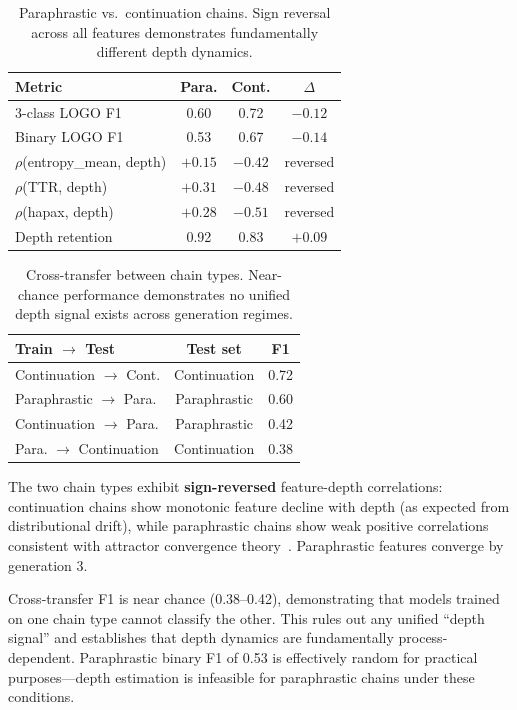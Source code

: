 \documentclass[11pt,a4paper]{article}
\begin{document}
\begin{table}[h]
\centering
\small
\begin{tabular}{lccc}
\toprule
\textbf{Metric} & \textbf{Para.} & \textbf{Cont.} & \textbf{$\Delta$} \\
\midrule
3-class LOGO F1 & 0.60 & 0.72 & $-0.12$ \\
Binary LOGO F1 & 0.53 & 0.67 & $-0.14$ \\
$\rho$(entropy\_mean, depth) & $+0.15$ & $-0.42$ & reversed \\
$\rho$(TTR, depth) & $+0.31$ & $-0.48$ & reversed \\
$\rho$(hapax, depth) & $+0.28$ & $-0.51$ & reversed \\
Depth retention & 0.92 & 0.83 & $+0.09$ \\
\bottomrule
\end{tabular}
\caption{Paraphrastic vs.\ continuation chains. Sign reversal across all features demonstrates fundamentally different depth dynamics.}
\label{tab:para_cont}
\end{table}

\begin{table}[h]
\centering
\small
\begin{tabular}{lcc}
\toprule
\textbf{Train $\rightarrow$ Test} & \textbf{Test set} & \textbf{F1} \\
\midrule
Continuation $\rightarrow$ Cont. & Continuation & 0.72 \\
Paraphrastic $\rightarrow$ Para. & Paraphrastic & 0.60 \\
Continuation $\rightarrow$ Para. & Paraphrastic & 0.42 \\
Para. $\rightarrow$ Continuation & Continuation & 0.38 \\
\bottomrule
\end{tabular}
\caption{Cross-transfer between chain types. Near-chance performance demonstrates no unified depth signal exists across generation regimes.}
\label{tab:cross_transfer}
\end{table}

The two chain types exhibit \textbf{sign-reversed} feature-depth correlations: continuation chains show monotonic feature decline with depth (as expected from distributional drift), while paraphrastic chains show weak positive correlations consistent with attractor convergence theory~\cite{bertrand2025llm}. Paraphrastic features converge by generation 3.

Cross-transfer F1 is near chance (0.38--0.42), demonstrating that models trained on one chain type cannot classify the other. This rules out any unified ``depth signal'' and establishes that depth dynamics are fundamentally process-dependent. Paraphrastic binary F1 of 0.53 is effectively random for practical purposes---depth estimation is infeasible for paraphrastic chains under these conditions.
\end{document}

